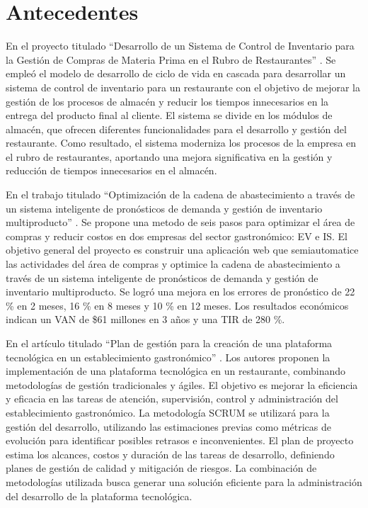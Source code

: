 \section{Antecedentes}
En el proyecto titulado “Desarrollo de un Sistema de Control de Inventario para la Gestión de Compras de Materia Prima en el Rubro de Restaurantes” \cite{condorena2017desarrollo}. Se empleó el modelo de desarrollo de ciclo de vida en cascada para desarrollar un sistema de control de inventario para un restaurante con el objetivo de mejorar la gestión de los procesos de almacén y reducir los tiempos innecesarios en la entrega del producto final al cliente. El sistema se divide en los módulos de almacén, que ofrecen diferentes funcionalidades para el desarrollo y gestión del restaurante. Como resultado, el sistema moderniza los procesos de la empresa en el rubro de restaurantes, aportando una mejora significativa en la gestión y reducción de tiempos innecesarios en el almacén. 

\vspace{1\baselineskip}
En el trabajo titulado  “Optimización de la cadena de abastecimiento a través de un sistema inteligente de pronósticos de demanda y gestión de inventario multiproducto” \cite{pacheco2015rediseno}. Se propone una metodo de seis pasos para optimizar el área de compras y reducir costos en dos empresas del sector gastronómico: EV e IS. El objetivo general del proyecto es construir una aplicación web que semiautomatice las actividades del área de compras y optimice la cadena de abastecimiento a través de un sistema inteligente de pronósticos de demanda y gestión de inventario multiproducto. Se logró una mejora en los errores de pronóstico de 22 \%   en 2 meses, 16 \% en 8 meses y 10 \% en 12 meses. Los resultados económicos indican un VAN de \$61 millones en 3 años y una TIR de 280 \%.

\vspace{1\baselineskip}
En el artículo titulado  “Plan de gestión para la creación de una plataforma tecnológica en un establecimiento gastronómico” \cite{sanchez2018sistemas}. Los autores proponen la implementación de una plataforma tecnológica en un restaurante, combinando metodologías de gestión tradicionales y ágiles. El objetivo es mejorar la eficiencia y eficacia en las tareas de atención, supervisión, control y administración del establecimiento gastronómico. La metodología SCRUM se utilizará para la gestión del desarrollo, utilizando las estimaciones previas como métricas de evolución para identificar posibles retrasos e inconvenientes. El plan de proyecto estima los alcances, costos y duración de las tareas de desarrollo, definiendo planes de gestión de calidad y mitigación de riesgos. La combinación de metodologías utilizada busca generar una solución eficiente para la administración del desarrollo de la plataforma tecnológica. 

